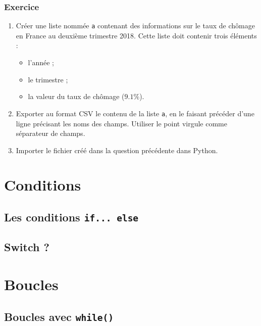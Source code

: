 \documentclass[12pt,]{book}
\providecommand{\tightlist}{%
  \setlength{\itemsep}{0pt}\setlength{\parskip}{0pt}}
\numberwithin{equation}{section}
\numberwithin{countremarque}{section}
\let\BeginKnitrBlock\begin \let\EndKnitrBlock\end
\begin{document}
\subsection{Exercice}\label{exercice-3}

\BeginKnitrBlock{exframe}
\begin{enumerate}
\def\labelenumi{\arabic{enumi}.}
\tightlist
\item
  Créer une liste nommée \texttt{a} contenant des informations sur le
  taux de chômage en France au deuxième trimestre 2018. Cette liste doit
  contenir trois éléments :

  \begin{itemize}
  \tightlist
  \item
    l'année ;
  \item
    le trimestre ;
  \item
    la valeur du taux de chômage (\(9.1\%\)).
  \end{itemize}
\item
  Exporter au format CSV le contenu de la liste \texttt{a}, en le
  faisant précéder d'une ligne précisant les noms des champs. Utiliser
  le point virgule comme séparateur de champs.
\item
  Importer le fichier créé dans la question précédente dans Python.
\end{enumerate}
\EndKnitrBlock{exframe}

\chapter{Conditions}\label{conditions}

\section{\texorpdfstring{Les conditions
\texttt{if...\ else}}{Les conditions if... else}}\label{les-conditions-if...-else}

\section{Switch ?}\label{switch}

\chapter{Boucles}\label{boucles}

\section{\texorpdfstring{Boucles avec
\texttt{while()}}{Boucles avec while()}}\label{boucles-avec-while}
\end{document}
